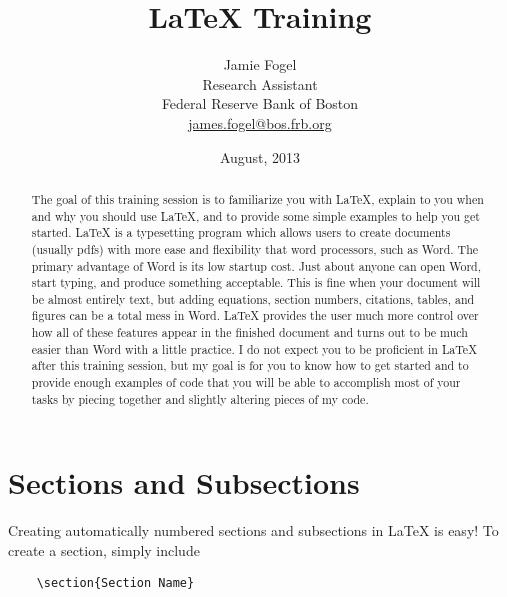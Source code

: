 \documentclass[11pt]{article}
\title{\LaTeX{} Training}
\author{Jamie Fogel \\
        Research Assistant \\
        Federal Reserve Bank of Boston \\
        \href{mailto:james.fogel@bos.frb.org}{james.fogel@bos.frb.org}
        }
\date{August, 2013}
\begin{document}
\renewcommand{\headrulewidth}{0pt}
\cfoot{\thepage}

\maketitle




\begin{abstract}
    The goal of this training session is to familiarize you with \LaTeX{}, explain to you when and why you should use \LaTeX{}, and to provide some simple examples to help you get started. \LaTeX{} is a typesetting program which allows users to create documents (usually pdfs) with more ease and flexibility that word processors, such as Word. The primary advantage of Word is its low startup cost. Just about anyone can open Word, start typing, and produce something acceptable. This is fine when your document will be almost entirely text, but adding equations, section numbers, citations, tables, and figures can be a total mess in Word. \LaTeX{} provides the user much more control over how all of these features appear in the finished document and turns out to be much easier than Word with a little practice. I do not expect you to be proficient in \LaTeX{} after this training session, but my goal is for you to know how to get started and to provide enough examples of code that you will be able to accomplish most of your tasks by piecing together and slightly altering pieces of my code.
\end{abstract}

\clearpage

\hypertarget{contents}{}
\tableofcontents

\section[Alternative Title for Section on Sections and Subsections]{Sections and Subsections}

Creating automatically numbered sections and subsections in \LaTeX{} is easy! To create a section, simply include
\begin{verbatim}
    \section{Section Name}
\end{verbatim}
\end{document}

